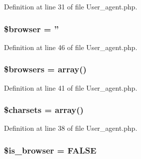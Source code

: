 Definition at line 31 of file User\-\_\-agent.\-php.

\hypertarget{class_c_i___user__agent_ada6112ba48917a0c8cc154ed90908b28}{
\subsubsection[{\$browser}]{\setlength{\rightskip}{0pt plus 5cm}\${\bf browser} = ''}}\label{class_c_i___user__agent_ada6112ba48917a0c8cc154ed90908b28}


Definition at line 46 of file User\-\_\-agent.\-php.

\hypertarget{class_c_i___user__agent_a81edf933083b5ac5b380385f59074a7d}{
\subsubsection[{\$browsers}]{\setlength{\rightskip}{0pt plus 5cm}\$browsers = array()}}\label{class_c_i___user__agent_a81edf933083b5ac5b380385f59074a7d}


Definition at line 41 of file User\-\_\-agent.\-php.

\hypertarget{class_c_i___user__agent_ae269ee30c94deb9b791c1ae5489b88f3}{
\subsubsection[{\$charsets}]{\setlength{\rightskip}{0pt plus 5cm}\${\bf charsets} = array()}}\label{class_c_i___user__agent_ae269ee30c94deb9b791c1ae5489b88f3}


Definition at line 38 of file User\-\_\-agent.\-php.

\hypertarget{class_c_i___user__agent_af9608f790bc03edf6c152d11cd879e04}{
\subsubsection[{\$is\-\_\-browser}]{\setlength{\rightskip}{0pt plus 5cm}\${\bf is\-\_\-browser} = F\-A\-L\-S\-E}}\label{class_c_i___user__agent_af9608f790bc03edf6c152d11cd879e04}


